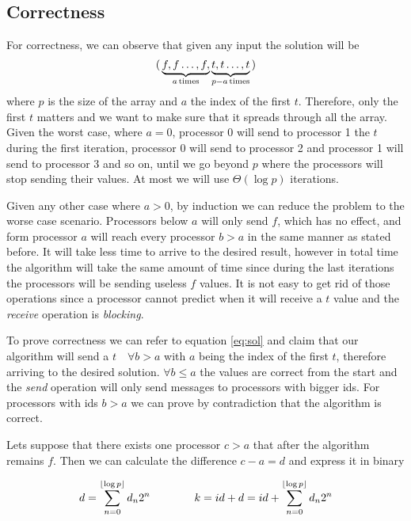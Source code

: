 \documentclass[a4paper]{article}
\begin{document}
    \newpage
    \subsection{Correctness}
    For correctness, we can observe that given any input the solution will be
    \begin{equation}
        (\,\underbrace{f,f\ldots,f,}_{a \text{\,times}} \underbrace{t,t\ldots,t}_{p-a \text{\,times}}\,)
        \label{eq:sol}
    \end{equation}
     where $p$ is the size of the array and $a$ the index of the first $t$. Therefore, only the first $t$ matters and we want to make sure that it spreads through all the array. Given the worst case, where $a = 0$, processor 0 will send to processor 1 the $t$ during the first iteration, processor 0 will send to processor 2 and processor 1 will send to processor 3 and so on, until we go beyond $p$ where the processors will stop sending their values. At most we will use $\Theta(\log p)$ iterations.

    Given any other case where $a > 0$, by induction we can reduce the problem to the worse case scenario. Processors below $a$ will only send $f$, which has no effect, and form processor $a$ will reach every processor $b > a$ in the same manner as stated before. It will take less time to arrive to the desired result, however in total time the algorithm will take the same amount of time since during the last iterations the processors will be sending useless $f$ values. It is not easy to get rid of those operations since a processor cannot predict when it will receive a $t$ value and the \emph{receive} operation is \emph{blocking}.

    To prove correctness we can refer to equation \ref{eq:sol} and claim that our algorithm will send a $t \quad\forall b > a$ with $a$ being the index of the first $t$, therefore arriving to the desired solution. $ \forall b  \leq a$ the values are correct from the start and the \emph{send} operation will only send messages to processors with bigger ids. For processors with ids $b > a$ we can prove by contradiction that the algorithm is correct.

    Lets suppose that there exists one processor $c > a$ that after the algorithm remains $f$. Then we can calculate the difference $c-a = d$ and express it in binary

    \begin{equation}
        d = \sum_{n=0}^{\lfloor\log{p}\rfloor} d_n 2^n \qquad\qquad
        k = id + d = id + \sum_{n=0}^{\lfloor\log{p}\rfloor} d_n 2^n
        \label{eq:bin}
    \end{equation}
\end{document}
